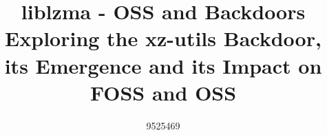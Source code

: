 

\title{liblzma - OSS and Backdoors\\\large Exploring the xz-utils
Backdoor, its Emergence and its Impact on FOSS and OSS}
\author{9525469}


    \maketitle
    
    
    
    
    
    \printbibliography

    


